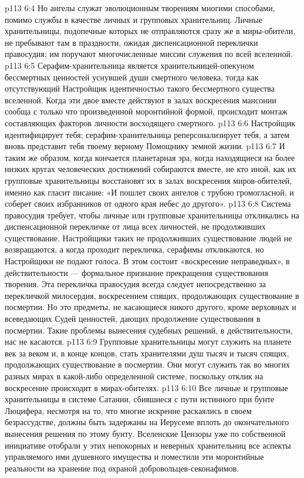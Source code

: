 \vs p113 6:4 \pc Но ангелы служат эволюционным творениям многими способами, помимо службы в качестве личных и групповых хранительниц. Личные хранительницы, подопечные которых не отправляются сразу же в миры\hyp{}обители, не пребывают там в праздности, ожидая диспенсационной переклички правосудия; им поручают многочисленные миссии служения по всей вселенной.
\vs p113 6:5 Серафим\hyp{}хранительница является хранительницей\hyp{}опекуном бессмертных ценностей уснувшей души смертного человека, тогда как отсутствующий Настройщик  идентичностью такого бессмертного существа вселенной. Когда эти двое вместе действуют в залах воскресения мансонии сообща с только что произведенной моронтийной формой, происходит монтаж составляющих факторов личности восходящего смертного.
\vs p113 6:6 Настройщик идентифицирует тебя; серафим\hyp{}хранительница реперсонализирует тебя, а затем вновь представит тебя твоему верному Помощнику земной жизни.
\vs p113 6:7 И таким же образом, когда кончается планетарная эра, когда находящиеся на более низких кругах человеческих достижений собираются вместе, не кто иной, как их групповые хранительницы восстановят их в залах воскресения миров\hyp{}обителей, именно как гласит писание: «И пошлет своих ангелов с трубою громогласной, и соберет своих избранников от одного края небес до другого».
\vs p113 6:8 \pc Система правосудия требует, чтобы личные или групповые хранительницы откликались на диспенсационной перекличке от лица всех личностей, не продолживших существование. Настройщики таких не продолживших существование людей не возвращаются, а когда проходит перекличка, серафимы откликаются, но Настройщики не подают голоса. В этом состоит «воскресение неправедных», в действительности --- формальное признание прекращения существования творения. Эта перекличка правосудия всегда следует непосредственно за перекличкой милосердия, воскресением спящих, продолжающих существование в посмертии. Но это предметы, не касающиеся никого другого, кроме верховных и всеведающих Судей ценностей, дающих продолжение существования в посмертии. Такие проблемы вынесения судебных решений, в действительности, нас не касаются.
\vs p113 6:9 \pc Групповые хранительницы могут служить на планете век за веком и, в конце концов, стать хранителями душ тысяч и тысяч спящих, продолжающих существование в посмертии. Они могут служить так во многих разных мирах в какой\hyp{}либо определенной системе, поскольку отклик на воскресение происходит в мирах\hyp{}обителях.
\vs p113 6:10 Все личные и групповые хранительницы в системе Сатании, сбившиеся с пути истинного при бунте Люцифера, несмотря на то, что многие искренне раскаялись в своем безрассудстве, должны быть задержаны на Иерусеме вплоть до окончательного вынесения решения по этому бунту. Вселенские Цензоры уже по собственной инициативе отобрали у этих непокорных и неверных хранительниц все аспекты управляемого ими душевного имущества и поместили эти моронтийные реальности на хранение под охраной добровольцев\hyp{}секонафимов.
